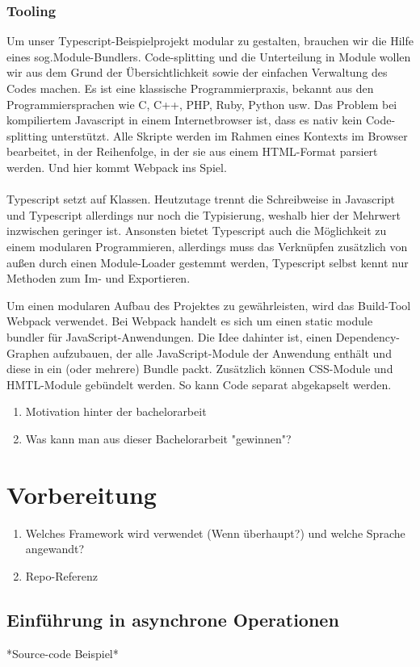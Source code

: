 \subsubsection{Tooling}
Um unser Typescript-Beispielprojekt modular zu gestalten, brauchen wir die Hilfe eines sog.\glqq Module-Bundlers\grqq{}. Code-splitting und die Unterteilung in Module wollen wir aus dem Grund der Übersichtlichkeit sowie der einfachen Verwaltung des Codes machen. Es ist eine klassische Programmierpraxis, bekannt aus den Programmiersprachen wie C, C++, PHP, Ruby, Python usw. Das Problem bei kompiliertem Javascript in einem Internetbrowser ist, dass es nativ kein Code-splitting unterstützt. Alle Skripte werden im Rahmen eines Kontexts im Browser bearbeitet, in der Reihenfolge, in der sie aus einem HTML-Format parsiert werden. Und hier kommt Webpack ins Spiel.  \cite{webpack-einfuehrung}
\\\\
Typescript setzt auf Klassen. Heutzutage trennt die Schreibweise in Javascript und Typescript allerdings nur noch die Typisierung, weshalb hier der Mehrwert inzwischen geringer ist. Ansonsten bietet Typescript auch die Möglichkeit zu einem modularen Programmieren, allerdings muss das Verknüpfen zusätzlich von außen durch einen Module-Loader gestemmt werden, Typescript selbst kennt nur Methoden zum Im- und Exportieren.

Um einen modularen Aufbau des Projektes zu gewährleisten, wird das Build-Tool \glqq{}Webpack\grqq{} verwendet. Bei Webpack handelt es sich um einen \glqq{}static module bundler\grqq{} für JavaScript-Anwendungen. Die Idee dahinter ist, einen Dependency-Graphen aufzubauen, der alle JavaScript-Module der Anwendung enthält und diese in ein (oder mehrere) Bundle packt. Zusätzlich können CSS-Module und HMTL-Module gebündelt werden. So kann Code separat abgekapselt werden.\cite{Webpack-basics}

\begin{enumerate} 
\item Motivation hinter der bachelorarbeit
\item Was kann man aus dieser Bachelorarbeit "gewinnen"?
\end{enumerate}

\section{Vorbereitung}
\begin{enumerate} 
\item Welches Framework wird verwendet (Wenn überhaupt?) und welche Sprache angewandt?
\item Repo-Referenz
\end{enumerate}

\subsection{Einführung in asynchrone Operationen}
*Source-code Beispiel*